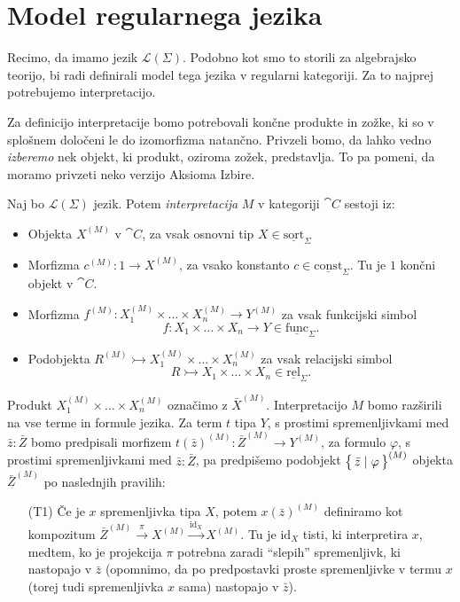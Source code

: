 \documentclass[../kategoricna_logika.tex]{subfiles}
\begin{document}
\section{Model regularnega jezika}
Recimo, da imamo jezik $\mathcal{L}(\Sigma)$. Podobno kot smo to
storili za algebrajsko teorijo, bi radi definirali model tega jezika v
regularni kategoriji.  Za to najprej potrebujemo interpretacijo.
\begin{opomba}
  Za definicijo interpretacije bomo potrebovali končne produkte in
  zožke, ki so v splošnem določeni le do izomorfizma natančno.
  Privzeli bomo, da lahko vedno \emph{izberemo} nek objekt, ki
  produkt, oziroma zožek, predstavlja. To pa pomeni, da moramo
  privzeti neko verzijo Aksioma Izbire.
\end{opomba}
\begin{definicija}
  Naj bo $\mathcal{L}(\Sigma)$ jezik. Potem \emph{interpretacija} $M$
  v kategoriji $\cat{C}$ sestoji iz:
  \begin{itemize}
  \item Objekta $X^{(M)}$ v $\cat{C}$, za vsak osnovni tip
    $X \in \underline{\mathrm{sort}}_\Sigma$
  \item Morfizma $c^{(M)} : 1 \to X^{(M)}$, za vsako konstanto
    $c \in \underline{\mathrm{const}}_\Sigma$. Tu je $1$ končni objekt
    v $\cat{C}$.
  \item Morfizma
    $f^{(M)} : X_1^{(M)} \times \ldots \times X_n^{(M)} \to Y^{(M)}$
    za vsak funkcijski simbol
    \[f : X_1 \times \ldots \times X_n \to Y \in
      \underline{\mathrm{func}}_\Sigma.\]
  \item Podobjekta
    $R^{(M)} \rightarrowtail X_1^{(M)} \times \ldots \times X_n^{(M)}$
    za vsak relacijski simbol
    \[R \rightarrowtail X_1 \times \ldots \times X_n \in
      \underline{\mathrm{rel}}_\Sigma.\]
  \end{itemize}
  Produkt $X_1^{(M)} \times \ldots \times X_n^{(M)}$ označimo z
  $\bar{X}^{(M)}$.  Interpretacijo $M$ bomo razširili na vse terme in
  formule jezika.  Za term $t$ tipa $Y$, s prostimi spremenljivkami
  med $\bar{z} : \bar{Z}$ bomo predpisali morfizem
  $t(\bar{z})^{(M)} : \bar{Z}^{(M)} \to Y^{(M)}$, za formulo
  $\varphi$, s prostimi spremenljivkami med $\bar{z} : \bar{Z}$, pa
  predpišemo podobjekt $\left\lbrace\,\bar{z} \mid \varphi\,\right\rbrace^{(M)}$ objekta
  $\bar{Z}^{(M)}$ po naslednjih pravilih:
  \begin{itemize}
  \item[(T1)] Če je $x$ spremenljivka tipa $X$, potem
    $x(\bar{z})^{(M)}$ definiramo kot kompo\-zi\-tum
    $\bar{Z}^{(M)} \xrightarrow{\pi} X^{(M)}
    \xrightarrow{\mathrm{id}_X} X^{(M)}$.  Tu je $\mathrm{id}_X$
    tisti, ki interpretira $x$, medtem, ko je projekcija $\pi$
    potrebna zaradi "`slepih"' spremenljivk, ki nastopajo v $\bar{z}$
    (opomnimo, da po predpostavki proste spremenljivke v termu $x$
    (torej tudi spremenljivka $x$ sama) nastopajo v $\bar{z}$).


\end{itemize}
\end{definicija}
\end{document}
